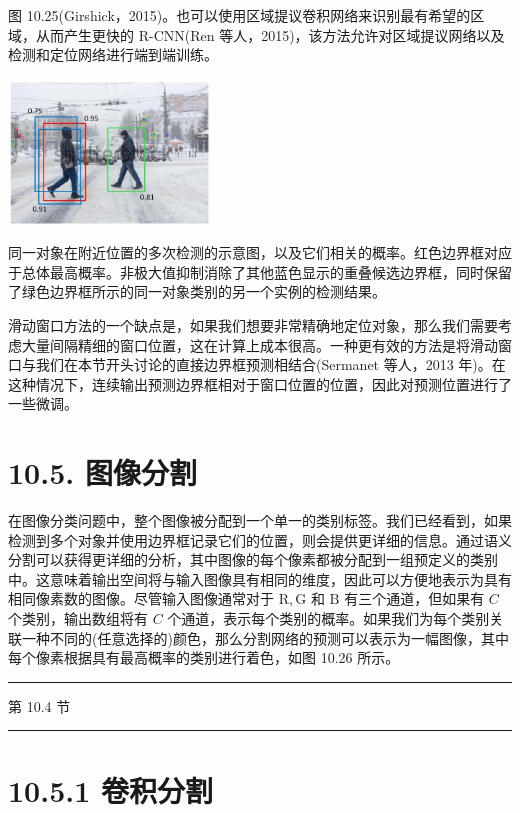 \documentclass[10pt]{article}
\newcommand{\HRule}{\begin{center}\rule{0.9\linewidth}{0.2mm}\end{center}}
\begin{document}
图 10.25(Girshick，2015)。也可以使用区域提议卷积网络来识别最有希望的区域，从而产生更快的 R-CNN(Ren 等人，2015)，该方法允许对区域提议网络以及检测和定位网络进行端到端训练。

\begin{center}
\includegraphics[max width=0.4\textwidth]{images/0194e279-9b28-703a-88f4-c3ac21e2010d_334_931_347_614_444_0.jpg}
\end{center}
\hspace*{3em} 

同一对象在附近位置的多次检测的示意图，以及它们相关的概率。红色边界框对应于总体最高概率。非极大值抑制消除了其他蓝色显示的重叠候选边界框，同时保留了绿色边界框所示的同一对象类别的另一个实例的检测结果。

滑动窗口方法的一个缺点是，如果我们想要非常精确地定位对象，那么我们需要考虑大量间隔精细的窗口位置，这在计算上成本很高。一种更有效的方法是将滑动窗口与我们在本节开头讨论的直接边界框预测相结合(Sermanet 等人，2013 年)。在这种情况下，连续输出预测边界框相对于窗口位置的位置，因此对预测位置进行了一些微调。

\section*{10.5. 图像分割}

在图像分类问题中，整个图像被分配到一个单一的类别标签。我们已经看到，如果检测到多个对象并使用边界框记录它们的位置，则会提供更详细的信息。通过语义分割可以获得更详细的分析，其中图像的每个像素都被分配到一组预定义的类别中。这意味着输出空间将与输入图像具有相同的维度，因此可以方便地表示为具有相同像素数的图像。尽管输入图像通常对于 \(\mathrm{R},\mathrm{G}\) 和 \(\mathrm{B}\) 有三个通道，但如果有 \(C\) 个类别，输出数组将有 \(C\) 个通道，表示每个类别的概率。如果我们为每个类别关联一种不同的(任意选择的)颜色，那么分割网络的预测可以表示为一幅图像，其中每个像素根据具有最高概率的类别进行着色，如图 10.26 所示。

\HRule

第 10.4 节

\HRule

\section*{10.5.1 卷积分割}
\end{document}
